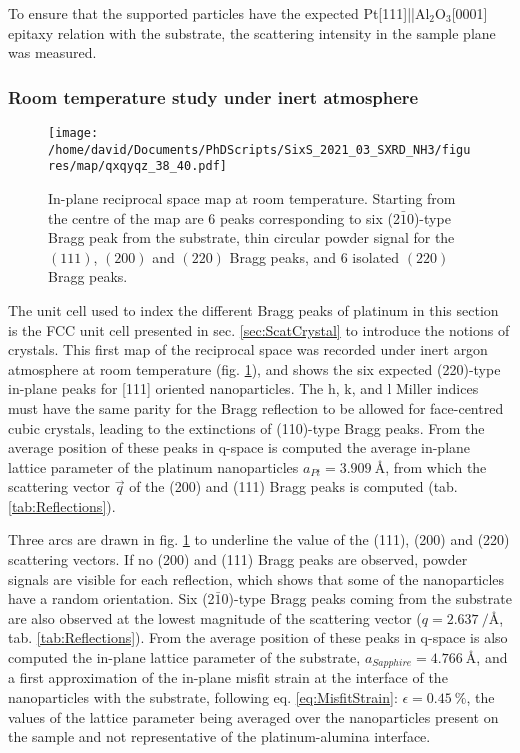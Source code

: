 To ensure that the  supported particles have the expected Pt[111]||Al$_2$O$_3$[0001] epitaxy relation with the substrate, the scattering intensity in the sample plane was measured.

\subsubsection{Room temperature study under inert atmosphere}

\begin{figure}[!htb]
    \centering
    \texttt{[image: /home/david/Documents/PhDScripts/SixS\_2021\_03\_SXRD\_NH3/figures/map/qxqyqz\_38\_40.pdf]}
    \caption{
        In-plane reciprocal space map at room temperature.
        Starting from the centre of the map are 6 peaks corresponding to six (2$\bar{1}$0)-type Bragg peak from the substrate, thin circular powder signal for the $(111)$, $(200)$ and $(220)$ Bragg peaks, and 6 isolated $(220)$ Bragg peaks.
    }
    \label{fig:QxQyMap}
\end{figure}

The unit cell used to index the different Bragg peaks of platinum in this section is the FCC unit cell presented in sec. \ref{sec:ScatCrystal} to introduce the notions of crystals.
This first map of the reciprocal space was recorded under inert argon atmosphere at room temperature (fig. \ref{fig:QxQyMap}), and shows the six expected (220)-type in-plane peaks for [111] oriented nanoparticles.
The h, k, and l Miller indices must have the same parity for the Bragg reflection to be allowed for face-centred cubic crystals, leading to the extinctions of (110)-type Bragg peaks.
From the average position of these peaks in q-space is computed the average in-plane lattice parameter of the platinum nanoparticles $a_{Pt}=\qty{3.909}{\angstrom}$, from which the scattering vector $\vec{q}$ of the (200) and (111) Bragg peaks is computed (tab. \ref{tab:Reflections}).

Three arcs are drawn in fig. \ref{fig:QxQyMap} to underline the value of the (111), (200) and (220) scattering vectors.
If no (200) and (111) Bragg peaks are observed, powder signals are visible for each reflection, which shows that some of the nanoparticles have a random orientation.
Six (2$\bar{1}$0)-type Bragg peaks coming from the  substrate are also observed at the lowest magnitude of the scattering vector ($q = \qty{2.637}{\per\angstrom}$, tab. \ref{tab:Reflections}).
From the average position of these peaks in q-space is also computed the in-plane lattice parameter of the substrate, $a_{Sapphire}=\qty{4.766}{\angstrom}$, and a first approximation of the in-plane misfit strain at the interface of the nanoparticles with the substrate, following eq. \ref{eq:MisfitStrain}: $\epsilon = \qty{0.45}{\percent}$, the values of the lattice parameter being averaged over the nanoparticles present on the sample and not representative of the platinum-alumina interface.

